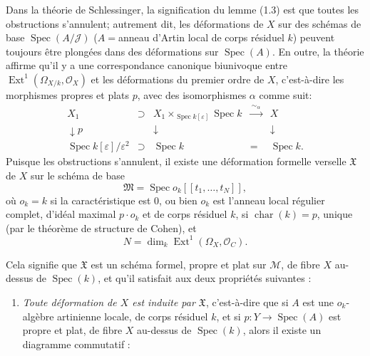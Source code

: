 \documentclass[10pt]{article}
\newcommand{\Spec}{\operatorname{Spec}}
\newcommand{\Ext}{\operatorname{Ext}}
\newcommand{\cO}{\mathcal O}
\newcommand{\cM}{\mathcal M}
\newcommand{\cX}{\mathfrak X}
\newcommand{\eps}{\varepsilon}
\begin{document}
Dans la théorie de Schlessinger, la signification du lemme (1.3) est que toutes les obstructions s'annulent; autrement dit, les déformations de $X$ sur des schémas de base $\Spec(A/\mathcal J)$ ($A={}$anneau d'Artin local de corps résiduel $k$) peuvent toujours être plongées dans des déformations sur $\Spec(A)$. En outre, la théorie affirme qu'il y a une correspondance canonique biunivoque entre $\Ext^1(\Omega_{X/k},\cO_X)$ et les déformations du premier ordre de $X$, c'est-à-dire les morphismes propres et plats $p$, avec des isomorphismes $\alpha$ comme suit:
\[
\begin{array}{ccccc}
X_1 & \supset & X_1\times_{\Spec k[\eps]}\Spec k & \xrightarrow{\ \sim_{\alpha}\ } & X \\
\downarrow p && \downarrow && \downarrow \\
\Spec k[\eps]/\eps^2 & \supset & \Spec k & = & \Spec k.
\end{array}
\]
Puisque les obstructions s'annulent, il existe une déformation formelle verselle $\mathfrak X$ de $X$ sur le schéma de base
\[
\mathfrak M=\Spec o_k[[t_1,\ldots,t_N]],
\]
où $o_k=k$ si la caractéristique est 0, ou bien $o_k$ est l'anneau local régulier complet, d'idéal maximal $p\cdot o_k$ et de corps résiduel $k$, si $\operatorname{char}(k)=p$, unique (par le théorème de structure de Cohen), et
\[
N=\dim_k \Ext^1(\Omega_X,\cO_C).
\]


Cela signifie que $\cX$ est un schéma formel, propre et plat sur $\cM$, de fibre $X$ au-dessus de $\Spec(k)$, et qu'il satisfait aux deux propriétés suivantes :

\begin{enumerate}[label=\emph{\alph*)}]
\item \emph{Toute déformation de $X$ est induite par $\cX$}, c'est-à-dire que si $A$ est une $o_k$-algèbre artinienne locale, de corps résiduel $k$, et si $p:Y\to\Spec(A)$ est propre et plat, de fibre $X$ au-dessus de $\Spec(k)$, alors il existe un diagramme commutatif :
\end{enumerate}

\begin{center}
\end{center}
\end{document}
